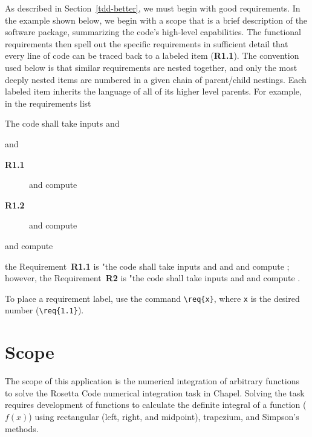 \label{Requirements}

\begin{seamlessnote}
  As described in Section~\ref{tdd-better}, we must begin with good requirements. In the example shown below,
  we begin with a scope that is a brief description of the software package, summarizing the code's high-level
  capabilities. The functional requirements then spell out the specific requirements in sufficient detail that 
  every line of code can be traced back to a labeled item (\eg \textbf{R1.1}). The convention used below is that
  similar requirements are nested together, and only the most deeply nested items are numbered in a given
  chain of parent/child nestings. Each labeled item inherits the language of all of its higher level parents.
  For example, in the requirements list
  \begin{description}
    \item The code shall take inputs  and 
      \begin{description}
        \item and 
          \begin{description}
            \item[\textbf{R1.1}] and compute 
            \item[\textbf{R1.2}] and compute 
          \end{description}
        \item[\textbf{R2}] and compute 
      \end{description}
  \end{description}
  the Requirement~\textbf{R1.1} is "the code shall take inputs  and  and 
  and compute ; however, the Requirement~\textbf{R2} is "the code shall take 
  inputs  and  and compute .

  To place a requirement label, use the command \lstinline!\req{x}!, where \texttt{x} is the desired 
  number (\eg \lstinline!\req{1.1}!).
\end{seamlessnote}


\section{Scope}
\label{Scope}

The scope of this application is the numerical integration of arbitrary functions 
to solve the Rosetta Code numerical integration task\cite{rosetta-code-numerical-integration}
in Chapel. Solving the task requires development of functions to calculate the definite 
integral of a function ($f(x)$) using rectangular (left, right, and midpoint), trapezium, and Simpson's methods.

